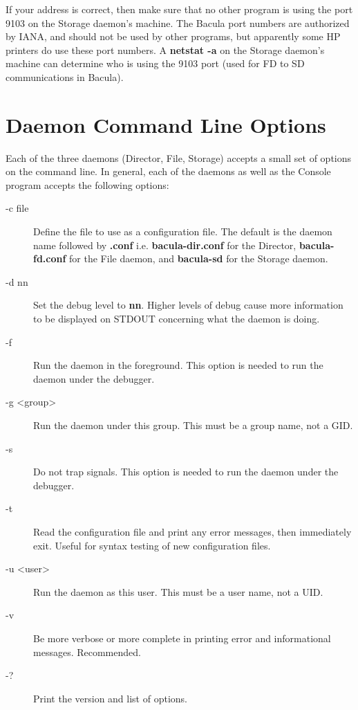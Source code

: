 If your address is correct, then make sure that no other program is using the
port 9103 on the Storage daemon's machine. The Bacula port numbers are
authorized by IANA, and should not be used by other programs, but apparently
some HP printers do use these port numbers. A {\bf netstat -a} on the Storage
daemon's machine can determine who is using the 9103 port (used for FD to SD
communications in Bacula). 

\section{Daemon Command Line Options}

Each of the three daemons (Director, File, Storage) accepts a small set of
options on the command line. In general, each of the daemons as well as the
Console program accepts the following options: 

\begin{description}

\item [-c \lt{}file\gt{}]
   Define the file to use as a  configuration file. The default is the daemon
   name followed  by {\bf .conf} i.e. {\bf bacula-dir.conf} for the Director, 
   {\bf bacula-fd.conf} for the File daemon, and {\bf bacula-sd}  for the Storage
   daemon.  

\item [-d nn]
   Set the debug level to {\bf nn}. Higher levels  of debug cause more
   information to be displayed on STDOUT concerning  what the daemon is doing.  

\item [-f]
   Run the daemon in the foreground. This option is  needed to run the daemon
   under the debugger.  

\item [-g <group>]
   Run the daemon under this group.  This must be a group name, not a GID.

\item [-s]
   Do not trap signals. This option is needed to run  the daemon under the
   debugger.  

\item [-t]
   Read the configuration file and print any error messages,  then immediately
   exit. Useful for syntax testing of  new configuration files.  

\item [-u <user>]
   Run the daemon as this user.  This must be a user name, not a UID.

\item [-v]
   Be more verbose or more complete in printing error  and informational
   messages. Recommended.  

\item [-?]
   Print the version and list of options. 

\end{description}


